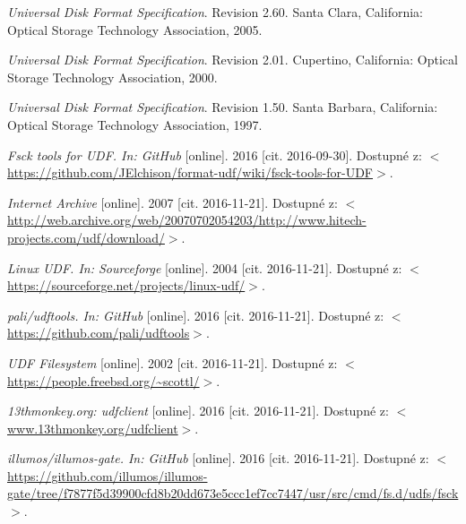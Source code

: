 \begin{literatura}{99}
	
    \emph{Universal Disk Format Specification}. Revision 2.60. Santa Clara, California: Optical Storage Technology Association, 2005.

    \emph{Universal Disk Format Specification}. Revision 2.01. Cupertino, California: Optical Storage Technology Association, 2000.

    \emph{Universal Disk Format Specification}. Revision 1.50. Santa Barbara, California: Optical Storage Technology Association, 1997.

    \emph{Fsck tools for UDF. In: GitHub}\/ [online]. 2016 [cit. 2016-09-30]. Dostupné z: \(<\)\url{https://github.com/JElchison/format-udf/wiki/fsck-tools-for-UDF}\(>\).  

    \emph{Internet Archive}\/ [online]. 2007 [cit. 2016-11-21]. Dostupné z: \(<\)\url{http://web.archive.org/web/20070702054203/http://www.hitech-projects.com/udf/download/}\(>\).  

    \emph{Linux UDF. In: Sourceforge}\/ [online]. 2004 [cit. 2016-11-21]. Dostupné z: \(<\)\url{https://sourceforge.net/projects/linux-udf/}\(>\).  

    \emph{pali/udftools. In: GitHub}\/ [online]. 2016 [cit. 2016-11-21]. Dostupné z: \(<\)\url{https://github.com/pali/udftools}\(>\).  

    \emph{UDF Filesystem}\/ [online]. 2002 [cit. 2016-11-21]. Dostupné z: \(<\)\url{https://people.freebsd.org/~scottl/}\(>\).  

    \emph{13thmonkey.org: udfclient}\/ [online]. 2016 [cit. 2016-11-21]. Dostupné z: \(<\)\url{www.13thmonkey.org/udfclient}\(>\).  

    \emph{illumos/illumos-gate. In: GitHub}\/ [online]. 2016 [cit. 2016-11-21]. Dostupné z: \(<\)\url{https://github.com/illumos/illumos-gate/tree/f7877f5d39900cfd8b20dd673e5ccc1ef7cc7447/usr/src/cmd/fs.d/udfs/fsck}\(>\).  


\end{literatura}
